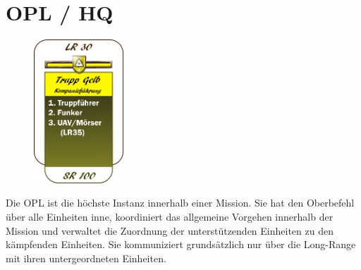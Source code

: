 \section{\acf{OPL} / \acf{HQ}}
\begin{figure}
	\vspace{-20pt}
	\centering 
	\includegraphics[width=0.3\textwidth]{./img/truppenordnung/opl/opl}
	\vspace{-20pt}
\end{figure}	

Die \ac{OPL} ist die höchste Instanz innerhalb einer Mission. Sie hat den Oberbefehl über alle Einheiten inne, koordiniert das allgemeine Vorgehen innerhalb der Mission und verwaltet die Zuordnung der unterstützenden Einheiten zu den kämpfenden Einheiten. Sie kommuniziert grundsätzlich nur über die Long-Range mit ihren untergeordneten Einheiten.\vspace{12pt}\\

